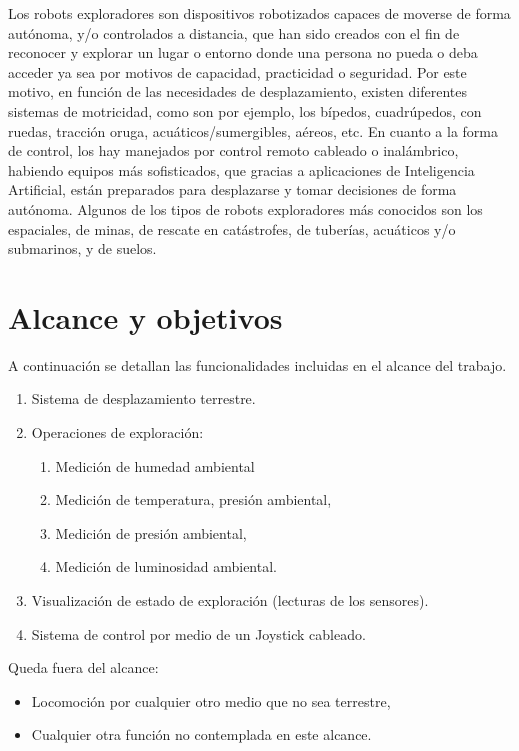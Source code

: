 Los robots exploradores son dispositivos robotizados capaces de moverse de forma autónoma, y/o controlados a distancia, que han sido creados con el fin de reconocer y explorar un lugar o entorno donde una persona no pueda o deba acceder ya sea por motivos de capacidad, practicidad o seguridad. Por este motivo, en función de las necesidades de desplazamiento, existen diferentes sistemas de motricidad, como son por ejemplo, los bípedos, cuadrúpedos, con ruedas, tracción oruga, acuáticos/sumergibles, aéreos, etc. En cuanto a la forma de control, los hay manejados por control remoto cableado o inalámbrico, habiendo equipos más sofisticados, que gracias a aplicaciones de Inteligencia Artificial, están preparados para desplazarse y tomar decisiones de forma autónoma. Algunos de los tipos de robots exploradores más conocidos son los espaciales, de minas, de rescate en catástrofes, de tuberías, acuáticos y/o submarinos, y de suelos.



\section{Alcance y objetivos}
A continuación se detallan las funcionalidades incluidas en el alcance del trabajo.

\begin{enumerate}
	\item Sistema de desplazamiento terrestre.
	\item Operaciones de exploración:
	\begin{enumerate}	
		 \item Medición de humedad ambiental
		 \item Medición de temperatura, presión ambiental,
		 \item Medición de presión ambiental,
		 \item Medición de luminosidad ambiental.
	\end{enumerate}

	\item Visualización de estado de exploración (lecturas de los sensores).
	\item Sistema de control por medio de un Joystick cableado.
\end{enumerate}

Queda fuera del alcance:
\begin{itemize}
	\item Locomoción por cualquier otro medio que no sea terrestre,
	\item Cualquier otra función no contemplada en este alcance.
\end{itemize}


